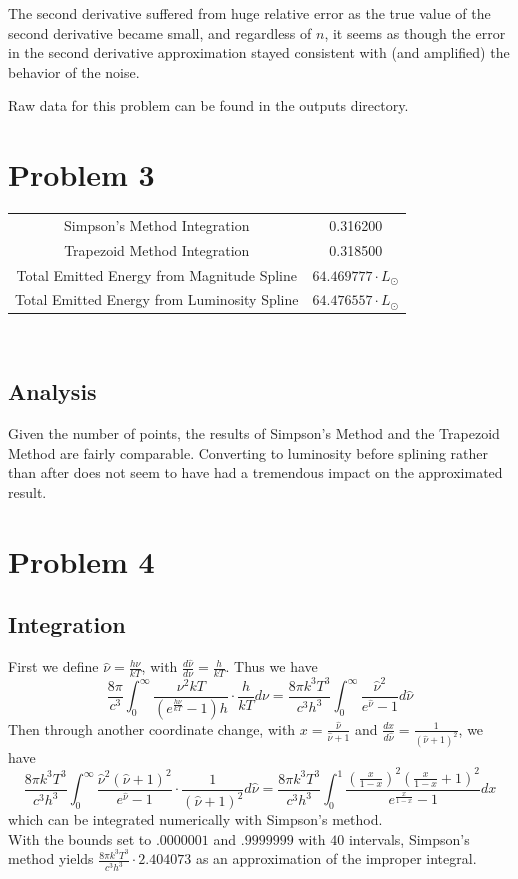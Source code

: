 \documentclass[11pt,fleqn]{article} %
\begin{document}
The second derivative suffered from huge relative error as the true value of the second derivative became small, and regardless of $n$, it seems as though the error in the second derivative approximation stayed consistent with (and amplified) the behavior of the noise.

Raw data for this problem can be found in the outputs directory.

\section*{Problem 3}
\begin{tabular}{c c}
Simpson's Method Integration & 0.316200 \\
Trapezoid Method Integration & 0.318500 \\
Total Emitted Energy from Magnitude Spline & $64.469777\cdot L_\odot$\\
Total Emitted Energy from Luminosity Spline & $64.476557\cdot L_\odot$\\
\end{tabular}\\

\subsection*{Analysis}
Given the number of points, the results of Simpson's Method and the Trapezoid Method are fairly comparable. Converting to luminosity before splining rather than after does not seem to have had a tremendous impact on the approximated result.

\section*{Problem 4}
\subsection*{Integration}
First we define $\hat\nu = \frac{h\nu}{kT}$, with $\frac{d\hat\nu}{d\nu} = \frac{h}{kT}$. Thus we have
$$\frac{8\pi}{c^3} \int_{0}^{\infty} \frac{\nu^2kT}{(e^{\frac{h\nu}{kT}}-1)h}\cdot \frac{h}{kT} d\nu  = \frac{8\pi k^3T^3}{c^3h^3} \int_{0}^{\infty} \frac{\hat\nu^2}{e^{\hat\nu}-1} d\hat\nu$$ 
Then through another coordinate change, with $x = \frac{\hat\nu}{\hat\nu + 1}$ and $\frac{dx}{d\hat\nu} = \frac{1}{(\hat\nu + 1)^2}$, we have 
$$ \frac{8\pi k^3T^3}{c^3h^3} \int_{0}^{\infty} \frac{\hat\nu^2(\hat\nu+1)^2}{e^{\hat\nu}-1} \cdot \frac{1}{(\hat\nu + 1)^2} d\hat\nu =  \frac{8\pi k^3T^3}{c^3h^3} \int_{0}^{1} \frac{(\frac{x}{1-x})^2(\frac{x}{1-x} + 1)^2}{e^{\frac{x}{1-x}}-1}dx$$ 
which can be integrated numerically with Simpson's method.
\\
With the bounds set to $.0000001$ and $.9999999$ with $40$ intervals, Simpson's method yields $\frac{8\pi k^3T^3}{c^3h^3} \cdot 2.404073$ as an approximation of the improper integral.
\end{document}
